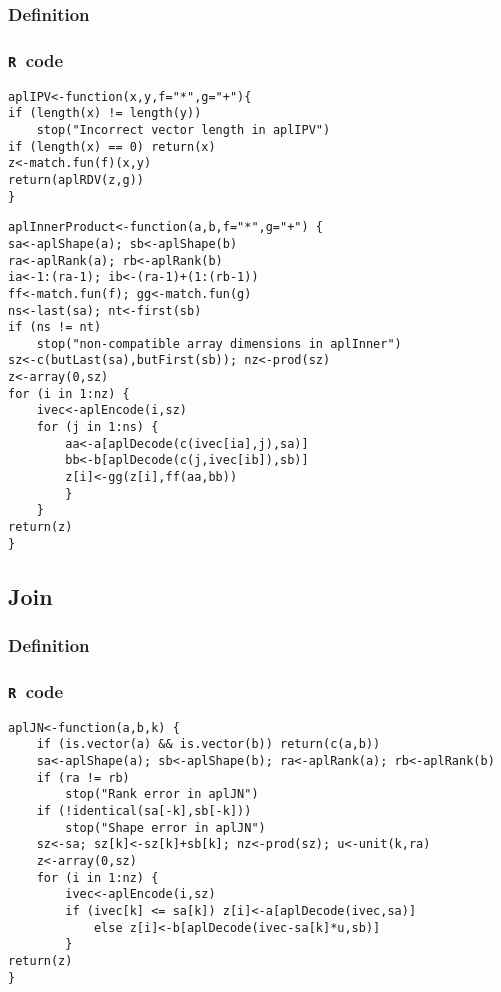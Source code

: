 \documentclass[11pt]{amsart}
\theoremstyle{plain}
\theoremstyle{definition}
\theoremstyle{remark}
\newcommand{\tR}{\texttt{R}}
\begin{document}
\subsubsection{Definition}
\subsubsection{\tR\ code}\quad
\begin{lstlisting}
aplIPV<-function(x,y,f="*",g="+"){
if (length(x) != length(y))
    stop("Incorrect vector length in aplIPV")
if (length(x) == 0) return(x)
z<-match.fun(f)(x,y)
return(aplRDV(z,g))
}
\end{lstlisting}
\begin{lstlisting}
aplInnerProduct<-function(a,b,f="*",g="+") {
sa<-aplShape(a); sb<-aplShape(b)
ra<-aplRank(a); rb<-aplRank(b)
ia<-1:(ra-1); ib<-(ra-1)+(1:(rb-1))
ff<-match.fun(f); gg<-match.fun(g)
ns<-last(sa); nt<-first(sb)
if (ns != nt)
    stop("non-compatible array dimensions in aplInner")
sz<-c(butLast(sa),butFirst(sb)); nz<-prod(sz)
z<-array(0,sz)
for (i in 1:nz) {
    ivec<-aplEncode(i,sz)
    for (j in 1:ns) {
        aa<-a[aplDecode(c(ivec[ia],j),sa)]
        bb<-b[aplDecode(c(j,ivec[ib]),sb)]
        z[i]<-gg(z[i],ff(aa,bb))
        }
    }
return(z)
}
\end{lstlisting}

\subsection{Join}\quad
\subsubsection{Definition}
\subsubsection{\tR\ code}\quad
\begin{lstlisting}
aplJN<-function(a,b,k) {
    if (is.vector(a) && is.vector(b)) return(c(a,b))
    sa<-aplShape(a); sb<-aplShape(b); ra<-aplRank(a); rb<-aplRank(b)
    if (ra != rb)
        stop("Rank error in aplJN")
    if (!identical(sa[-k],sb[-k]))
        stop("Shape error in aplJN")
    sz<-sa; sz[k]<-sz[k]+sb[k]; nz<-prod(sz); u<-unit(k,ra)
    z<-array(0,sz)
    for (i in 1:nz) {
        ivec<-aplEncode(i,sz)
        if (ivec[k] <= sa[k]) z[i]<-a[aplDecode(ivec,sa)]
            else z[i]<-b[aplDecode(ivec-sa[k]*u,sb)]
        }
return(z)
}
\end{lstlisting}
\end{document}
